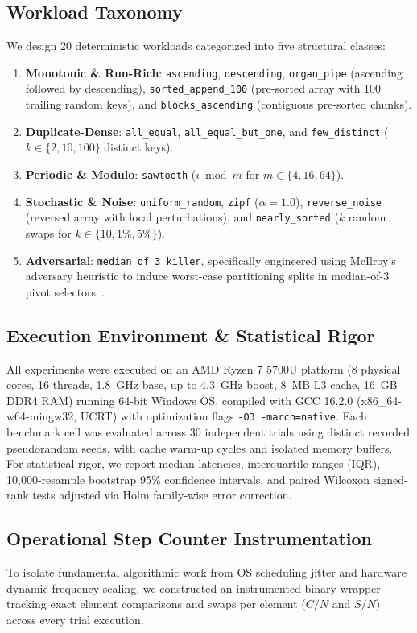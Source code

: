 \documentclass[journal]{IEEEtran}
\begin{document}
\subsection{Workload Taxonomy}
We design 20 deterministic workloads categorized into five structural classes:
\begin{enumerate}
    \item \textbf{Monotonic \& Run-Rich}: \texttt{ascending}, \texttt{descending}, \texttt{organ\_pipe} (ascending followed by descending), \texttt{sorted\_append\_100} (pre-sorted array with 100 trailing random keys), and \texttt{blocks\_ascending} (contiguous pre-sorted chunks).
    \item \textbf{Duplicate-Dense}: \texttt{all\_equal}, \texttt{all\_equal\_but\_one}, and \texttt{few\_distinct} ($k \in \{2, 10, 100\}$ distinct keys).
    \item \textbf{Periodic \& Modulo}: \texttt{sawtooth} ($i \bmod m$ for $m \in \{4, 16, 64\}$).
    \item \textbf{Stochastic \& Noise}: \texttt{uniform\_random}, \texttt{zipf} ($\alpha = 1.0$), \texttt{reverse\_noise} (reversed array with local perturbations), and \texttt{nearly\_sorted} ($k$ random swaps for $k \in \{10, 1\%, 5\%\}$).
    \item \textbf{Adversarial}: \texttt{median\_of\_3\_killer}, specifically engineered using McIlroy's adversary heuristic to induce worst-case partitioning splits in median-of-3 pivot selectors~\cite{musser1997introspective}.
\end{enumerate}

\subsection{Execution Environment \& Statistical Rigor}
All experiments were executed on an AMD Ryzen 7 5700U platform (8 physical cores, 16 threads, 1.8~GHz base, up to 4.3~GHz boost, 8~MB L3 cache, 16~GB DDR4 RAM) running 64-bit Windows OS, compiled with GCC 16.2.0 (x86\_64-w64-mingw32, UCRT) with optimization flags \texttt{-O3 -march=native}. Each benchmark cell was evaluated across 30 independent trials using distinct recorded pseudorandom seeds, with cache warm-up cycles and isolated memory buffers.
For statistical rigor, we report median latencies, interquartile ranges (IQR), 10,000-resample bootstrap 95\% confidence intervals, and paired Wilcoxon signed-rank tests adjusted via Holm family-wise error correction.

\subsection{Operational Step Counter Instrumentation}
To isolate fundamental algorithmic work from OS scheduling jitter and hardware dynamic frequency scaling, we constructed an instrumented binary wrapper tracking exact element comparisons and swaps per element ($C/N$ and $S/N$) across every trial execution.
\end{document}
